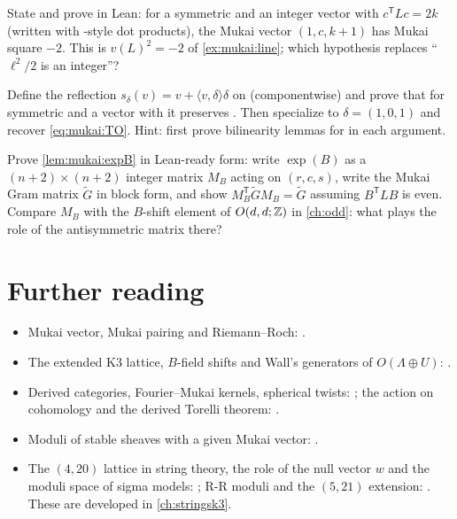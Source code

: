 \begin{exercise}\label{exo:mukai:leanline}
State and prove in Lean: for a symmetric  and an integer vector  with
$c^{\mathsf T}Lc=2k$ (written with -style dot products), the Mukai vector
$(1,c,k+1)$ has Mukai square $-2$. This is
$v(L)^2=-2$ of \cref{ex:mukai:line}; which hypothesis replaces ``$\ell^2/2$ is an integer''?
\end{exercise}

\begin{exercise}\label{exo:mukai:leanreflection}
Define the reflection $s_\delta(v)=v+\langle v,\delta\rangle\delta$ on 
(componentwise) and prove that for symmetric  and a vector  with  it
preserves . Then specialize to $\delta=(1,0,1)$ and recover
\eqref{eq:mukai:TO}. Hint: first prove bilinearity lemmas for  in each argument.
\end{exercise}

\begin{exercise}[$\star\star\star$]\label{exo:mukai:expBwall}
Prove \cref{lem:mukai:expB} in Lean-ready form: write $\exp(B)$ as a $(n+2)\times(n+2)$ integer
matrix $M_B$ acting on $(r,c,s)$, write the Mukai Gram matrix $\widetilde G$ in block form, and
show $M_B^{\mathsf T}\widetilde GM_B=\widetilde G$ assuming $B^{\mathsf T}LB$ is even. Compare
$M_B$ with the $B$-shift element of $O(d,d;\mathbb{Z})$ in \cref{ch:odd}: what plays the role of the
antisymmetric matrix there?
\end{exercise}

\section*{Further reading}
\begin{itemize}[leftmargin=*]
\item Mukai vector, Mukai pairing and Riemann--Roch: .
\item The extended K3 lattice, $B$-field shifts and Wall's generators of $O(\Lambda\oplus U)$:
  .
\item Derived categories, Fourier--Mukai kernels, spherical twists:
  ; the action on cohomology and the derived Torelli
  theorem: .
\item Moduli of stable sheaves with a given Mukai vector: .
\item The $(4,20)$ lattice in string theory, the role of the null vector $w$ and the moduli
  space of sigma models: ; R-R moduli and the $(5,21)$
  extension: . These are developed in \cref{ch:stringsk3}.
\end{itemize}
